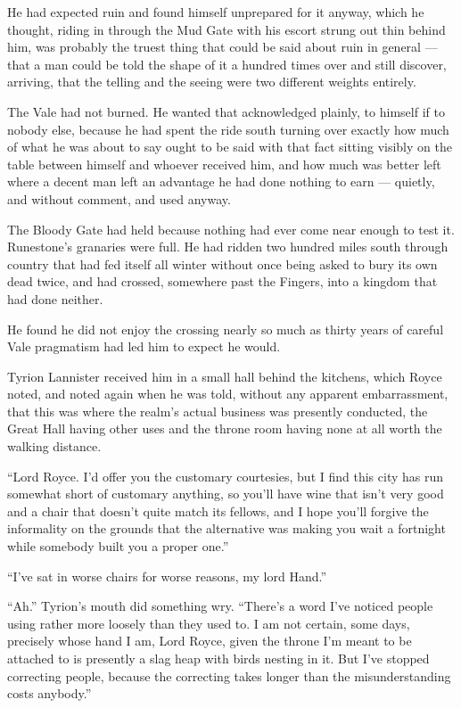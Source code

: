 He had expected ruin and found himself unprepared for it anyway, which he thought, riding in through the Mud Gate with his escort strung out thin behind him, was probably the truest thing that could be said about ruin in general — that a man could be told the shape of it a hundred times over and still discover, arriving, that the telling and the seeing were two different weights entirely.

The Vale had not burned. He wanted that acknowledged plainly, to himself if to nobody else, because he had spent the ride south turning over exactly how much of what he was about to say ought to be said with that fact sitting visibly on the table between himself and whoever received him, and how much was better left where a decent man left an advantage he had done nothing to earn — quietly, and without comment, and used anyway.

The Bloody Gate had held because nothing had ever come near enough to test it. Runestone’s granaries were full. He had ridden two hundred miles south through country that had fed itself all winter without once being asked to bury its own dead twice, and had crossed, somewhere past the Fingers, into a kingdom that had done neither.

He found he did not enjoy the crossing nearly so much as thirty years of careful Vale pragmatism had led him to expect he would.

\sceneBreak

Tyrion Lannister received him in a small hall behind the kitchens, which Royce noted, and noted again when he was told, without any apparent embarrassment, that this was where the realm’s actual business was presently conducted, the Great Hall having other uses and the throne room having none at all worth the walking distance.

“Lord Royce. I’d offer you the customary courtesies, but I find this city has run somewhat short of customary anything, so you’ll have wine that isn’t very good and a chair that doesn’t quite match its fellows, and I hope you’ll forgive the informality on the grounds that the alternative was making you wait a fortnight while somebody built you a proper one.”

“I’ve sat in worse chairs for worse reasons, my lord Hand.”

“Ah.” Tyrion’s mouth did something wry. “There’s a word I’ve noticed people using rather more loosely than they used to. I am not certain, some days, precisely whose hand I am, Lord Royce, given the throne I’m meant to be attached to is presently a slag heap with birds nesting in it. But I’ve stopped correcting people, because the correcting takes longer than the misunderstanding costs anybody.”

